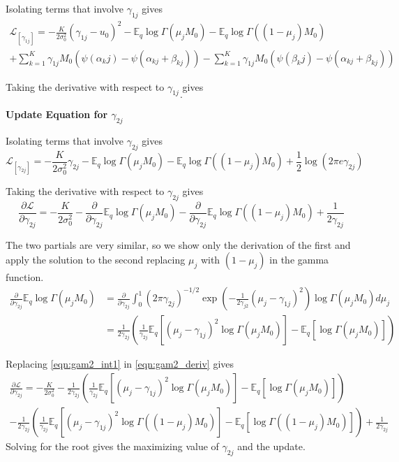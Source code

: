 \documentclass[10pt, letterpaper]{article}
\newcommand{\E}{\mathbb{E}}
\begin{document}
Isolating terms that involve $\gamma_{1j}$ gives
\begin{multline*}
\mathcal{L}_{[\gamma_{1j}]} = -\frac{K}{2\sigma_0^2}(\gamma_{1j}-u_0)^2 
-\E_q \log \Gamma(\mu_j M_0) -\E_q \log \Gamma((1-\mu_j)M_0) \\
+ \sum_{k=1}^K \gamma_{1j} M_0 ( \psi(\alpha_kj) - \psi(\alpha_{kj} + \beta_{kj}) )
- \sum_{k=1}^K \gamma_{1j} M_0 ( \psi(\beta_kj) - \psi(\alpha_{kj} + \beta_{kj}) )
\end{multline*}

Taking the derivative with respect to $\gamma_{1j}$  gives
\begin{equation}
.
\end{equation}

{\bf Update Equation for $\gamma_{2j}$ }\label{sec:gamma2_update}

Isolating terms that involve $\gamma_{2j}$ gives
\begin{equation*}
\mathcal{L}_{[\gamma_{2j}]} = -\frac{K}{2\sigma_0^2}\gamma_{2j} -\E_q\log\Gamma(\mu_jM_0) - \E_q\log\Gamma((1-\mu_j)M_0)+\frac{1}{2}\log(2\pi e \gamma_{2j})
\end{equation*}

Taking the derivative with respect to $\gamma_{2j}$ gives
\begin{equation}\label{eqn:gam2_deriv}
\frac{\partial \mathcal{L}}{\partial \gamma_{2j}} = -\frac{K}{2\sigma_0^2} -\frac{\partial}{\partial \gamma_{2j}}\E_q\log\Gamma(\mu_jM_0) -\frac{\partial}{\partial \gamma_{2j}}\E_q\log\Gamma((1-\mu_j)M_0) +\frac{1}{2\gamma_{2j}}
\end{equation}

The two partials are very similar, so we show only the derivation of the first and apply the solution to the second replacing $\mu_j$ with $(1-\mu_j)$ in the gamma function.
\begin{align}\label{eqn:gam2_int1}
\frac{\partial}{\partial \gamma_{2j}}\E_q\log\Gamma(\mu_jM_0) &= \frac{\partial}{\partial \gamma_{2j}} \int_0^1 (2\pi\gamma_{2j})^{-1/2}\exp\left(-\frac{1}{2\gamma_{j2}}(\mu_j-\gamma_{1j})^2\right) \log\Gamma(\mu_jM_0)d\mu_j \\
& = \frac{1}{2\gamma_{2j}}\left(\frac{1}{\gamma_{2j}} \E_q \left[ (\mu_j-\gamma_{1j})^2 \log\Gamma(\mu_jM_0) \right] - \E_q \left[ \log\Gamma(\mu_jM_0) \right] \right)
\end{align}

Replacing \eqref{eqn:gam2_int1} in \eqref{eqn:gam2_deriv} gives
\begin{multline}
\frac{\partial \mathcal{L}}{\partial \gamma_{2j}} = -\frac{K}{2\sigma_0^2} 
- \frac{1}{2\gamma_{2j}}\left(\frac{1}{\gamma_{2j}} \E_q \left[ (\mu_j-\gamma_{1j})^2 \log\Gamma(\mu_jM_0) \right] - \E_q \left[ \log\Gamma(\mu_jM_0) \right] \right) \\
- \frac{1}{2\gamma_{2j}}\left(\frac{1}{\gamma_{2j}} \E_q \left[ (\mu_j-\gamma_{1j})^2 \log\Gamma((1-\mu_j)M_0) \right] - \E_q \left[ \log\Gamma((1-\mu_j)M_0) \right] \right) +\frac{1}{2\gamma_{2j}}
\end{multline}
Solving for the root gives the maximizing value of $\gamma_{2j}$ and the update.
\end{document}
